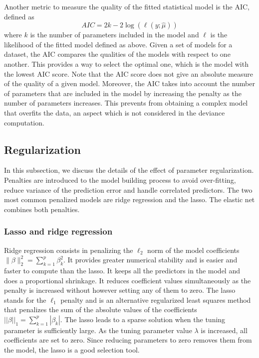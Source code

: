 Another metric to measure the quality of the fitted statistical model is the AIC, defined as
$$AIC = 2k -2\log(\ell(y;\hat{\mu}))$$
where $k$ is the number of parameters included in the model and $\ell$ is the likelihood of the fitted model defined as above.
 Given a set of models for a dataset, the AIC compares the qualities of the models with respect to one another. This provides a way to select the optimal one, which is the model with the lowest AIC score. Note that the AIC score does not give an absolute measure of the quality of a given model. Moreover, the AIC takes into account the number of parameters that are included in the model by increasing the penalty as the number of parameters increases. This prevents from obtaining a complex model that overfits the data, an aspect which is not considered in the deviance computation.
 
%
%

\subsection{Regularization} \label{regularization}
In this subsection, we discuss the details of the effect of parameter regularization. Penalties are introduced to the model building process to avoid over-fitting, reduce variance of the prediction error and handle correlated predictors. The two most common penalized models are ridge regression and the
lasso. The elastic net combines both penalties. 

\subsubsection{Lasso and ridge regression}

Ridge regression consists in penalizing the $\ell_2$ norm of the model coefficients $\| \beta \|_2^2=\sum_{k=1}^p \beta_k^2$. It provides greater numerical stability and is easier and faster to compute than the lasso. It keeps all the predictors in the model and does a proportional shrinkage. It reduces coefficient values simultaneously as the penalty is increased without however setting any of them to zero. The lasso stands for the $\ell_1$ penalty and is an alternative regularized least squares method that penalizes the sum of the absolute values of the coefficients 
$||\beta||_1=\sum_{k=1}^p |\beta_k|$. The lasso leads to a sparse solution when the tuning parameter is sufficiently large. As the tuning parameter value $\lambda$ is increased, all coefficients are set to zero. Since reducing
parameters to zero removes them from the model, the lasso is a good selection tool. 

